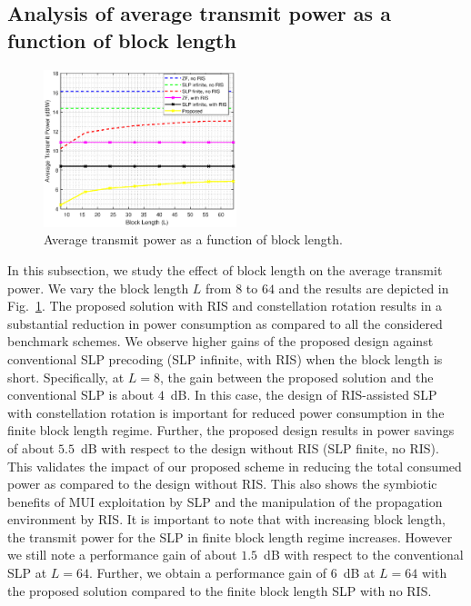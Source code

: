 \documentclass[10pt,conference]{IEEEtran}
\begin{document}
\subsection{Analysis of average transmit power as a function of block length}
\begin{figure}[h!]
    \centering	\includegraphics[width=0.5\textwidth]{Images/BL_FINAL2.eps}
	\caption{Average transmit power as a function of block length.}
	\label{fig:Const}
\end{figure}
In this subsection, we study the effect of block length on the average transmit power. We vary the block length $L$ from $8$ to $64$ and the results are depicted in Fig.~\ref{fig:Const}.  The proposed solution with RIS and constellation rotation results in a substantial reduction in power consumption as compared to all the considered benchmark schemes. We observe higher gains of the proposed design against conventional SLP precoding (SLP infinite, with RIS) when the block length is short.  Specifically, at $L=8$, the gain between the proposed solution and the conventional SLP is about $4$~dB. In this case, the design of RIS-assisted SLP with constellation rotation is important for reduced power consumption in the finite block length regime. Further, the proposed design results in power savings of about $5.5$~dB with respect to the design without RIS (SLP finite, no RIS). This validates the impact of our proposed scheme in reducing the total consumed power as compared to the design without RIS. This also shows the symbiotic benefits of MUI exploitation by SLP and the manipulation of the propagation environment by RIS. It is important to note that with increasing block length, the transmit power for the SLP in finite block length regime increases. However we still note a performance gain of about $1.5$~dB with respect to the conventional SLP at $L=64$. Further, we obtain a performance gain of $6$~dB at $L=64$ with the proposed solution compared to the finite block length SLP with no RIS.  
\end{document}
